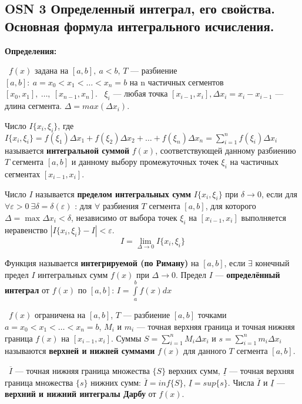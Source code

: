 \subsection{OSN 3 Определенный интеграл, его свойства. Основная формула интегрального исчисления.}

\textbf{Определения:}

\mathLet \ $f(x)$ задана на $[a,b],~a<b$, $T$ --- разбиение $[a,b]:~a=x_0 < x_1 < \dots < x_n = b$ на n частичных сегментов $[x_0,x_1],~\dots,~[x_{n-1},x_n]$. \mathLet \ $\xi_i$  --- любая точка $[x_{i-1}, x_i], \Delta x_i = x_i - x_{i-1}$ --- длина сегмента. $\Delta = max(\Delta x_i)$.

\bigbreak
Число $I\{x_i, \xi_i\}$, где
$I\{x_i,\xi_i\} = f(\xi_1) \Delta x_1 + f(\xi_2) \Delta x_2 + \dots + f(\xi_n) \Delta x_n = \displaystyle\sum_{i=1}^n f(\xi_i) \Delta x_i$ называется \textbf{интегральной суммой} $f(x)$, соответствующей данному разбиению $T$ сегмента $[a, b]$ и данному выбору промежуточных точек $\xi_i$ на частичных сегментах $[x_{i-1}, x_i]$.

\bigbreak
Число $I$ называется \textbf{пределом интегральных сумм} $I\{x_i, \xi_i\}$ при $\delta \to 0$, если для $\forall \varepsilon > 0~\exists \delta = \delta(\varepsilon)$ : для $\forall$ разбиения $T$ сегмента $[a, b]$, для которого $\Delta  = \max \Delta x_i < \delta$, независимо от выбора точек $\xi_i$ на $[x_{i-1}, x_i]$ выполняется неравенство $|I\{x_i, \xi_i\} - I| < \varepsilon$.
$$I = \lim\limits_{\Delta \to 0} I\{x_i,\xi_i\} $$

\bigbreak
Функция называется \textbf{интегрируемой (по Риману)} на $[a, b]$, если $\exists$ конечный предел $I$ интегральных сумм $f(x)$ при $\Delta \to 0$. Предел $I$ --- \textbf{определённый интеграл} от $f(x)$ по $[a,b]$: $I = \int\limits_a^b f(x)dx$

\bigbreak
\mathLet \ $f(x)$ ограничена на $[a, b]$, $T$ --- разбиение $[a, b]$ точками $a = x_0 < x_1 < \dots < x_n = b$, $M_i$ и $m_i$ --- точная верхняя граница и точная нижняя граница $f(x)$ на $[x_{i-1}, x_i]$. Суммы $S = \sum_{i=1}^n M_i\Delta x_i$ и $s = \sum_{i=1}^n m_i\Delta x_i$ называются \textbf{верхней и нижней суммами} $f(x)$ для данного $T$ сегмента $[a,b]$.

\bigbreak
\mathLet \ $\overline{I}$ --- точная нижняя граница множества $\{S\}$ верхних сумм, $\underline{I}$ --- точная верхняя граница множества $\{s\}$ нижних сумм: $\overline{I} = inf\{S\}$, $\underline{I} = sup\{s\}$. Числа $\overline{I}$ и $\underline{I}$ --- \textbf{верхний и нижний интегралы Дарбу} от $f(x)$.


